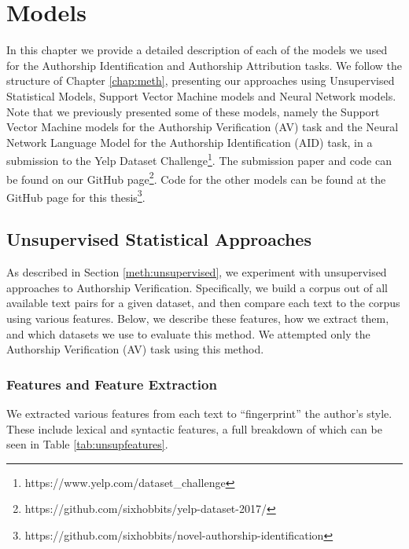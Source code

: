 \chapter{Models}
\label{chap:models}
In this chapter we provide a detailed description of each of the models we used for the Authorship Identification and Authorship Attribution tasks. We follow the structure of Chapter \ref{chap:meth}, presenting our approaches using Unsupervised Statistical Models, Support Vector Machine models and Neural Network models. Note that we previously presented some of these models, namely the Support Vector Machine models for the Authorship Verification (AV) task and the Neural Network Language Model for the Authorship Identification (AID) task, in a submission to the Yelp Dataset Challenge\footnote{https://www.yelp.com/dataset\_challenge}. The submission paper and code can be found on our GitHub page\footnote{https://github.com/sixhobbits/yelp-dataset-2017/}. Code for the other models can be found at the GitHub page for this thesis\footnote{https://github.com/sixhobbits/novel-authorship-identification}.

\section{Unsupervised Statistical Approaches}
As described in Section \ref{meth:unsupervised}, we experiment with unsupervised approaches to Authorship Verification. Specifically, we build a corpus out of all available text pairs for a given dataset, and then compare each text to the corpus using various features. Below, we describe these features, how we extract them, and which datasets we use to evaluate this method. We attempted only the Authorship Verification (AV) task using this method.

\subsection{Features and Feature Extraction}
We extracted various features from each text to ``fingerprint'' the author's style. These include lexical and syntactic features, a full breakdown of which can be seen in Table \ref{tab:unsupfeatures}.

